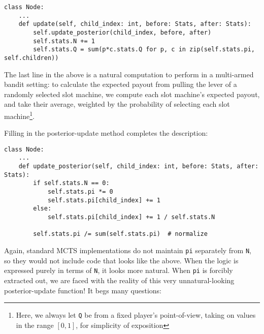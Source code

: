 \documentclass[tikz]{article}
\begin{document}
\begin{tcolorbox}
\begin{verbatim}
class Node:
    ...
    def update(self, child_index: int, before: Stats, after: Stats):
        self.update_posterior(child_index, before, after)
        self.stats.N += 1
        self.stats.Q = sum(p*c.stats.Q for p, c in zip(self.stats.pi, self.children))
\end{verbatim}
\end{tcolorbox}

The last line in the above is a natural computation to perform in a multi-armed bandit setting: 
to calculate the expected payout from pulling the lever of a randomly selected slot machine, 
we compute each slot machine's expected payout, and take their average, weighted by the probability of
selecting each slot machine\footnote{Here, we always let \texttt{Q} be from a fixed player's point-of-view, taking on values in the range $[0, 1]$, for simplicity of exposition}. \newline

Filling in the posterior-update method completes the description:

\begin{tcolorbox}
\begin{verbatim}
class Node:
    ...
    def update_posterior(self, child_index: int, before: Stats, after: Stats):
        if self.stats.N == 0:
            self.stats.pi *= 0
            self.stats.pi[child_index] += 1
        else:
            self.stats.pi[child_index] += 1 / self.stats.N

        self.stats.pi /= sum(self.stats.pi)  # normalize
\end{verbatim}
\end{tcolorbox}

Again, standard MCTS implementations do not maintain \texttt{pi} separately from \texttt{N}, so they would not include
code that looks like the above. When the logic is expressed purely in terms of \texttt{N}, it looks more natural. When \texttt{pi}
is forcibly extracted out, we are faced with the reality of this very unnatural-looking posterior-update function!
It begs many questions:
\end{document}
